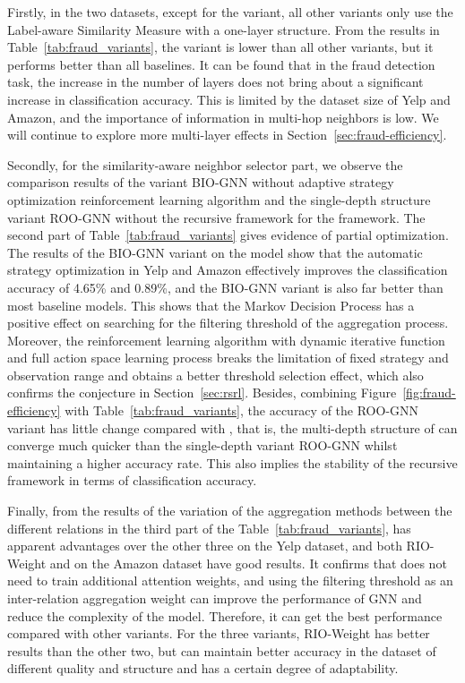 Firstly, in the two datasets, except for the \RioGNN variant, all other variants only use the Label-aware Similarity Measure with a one-layer structure.
From the results in Table~\ref{tab:fraud_variants}, the \RioGNN variant is lower than all other variants, but it performs better than all baselines.
It can be found that in the fraud detection task, the increase in the number of layers does not bring about a significant increase in classification accuracy.
This is limited by the dataset size of Yelp and Amazon, and the importance of information in multi-hop neighbors is low.
We will continue to explore more multi-layer effects in Section~\ref{sec:fraud-efficiency}.



Secondly, for the similarity-aware neighbor selector part, we observe the comparison results of the variant BIO-GNN without adaptive strategy optimization reinforcement learning algorithm and the single-depth structure variant ROO-GNN without the recursive framework for the \RSRL framework.
The second part of Table~\ref{tab:fraud_variants} gives evidence of partial optimization. 
The results of the BIO-GNN variant on the \RioGNN model show that the automatic strategy optimization in Yelp and Amazon effectively improves the classification accuracy of 4.65\% and 0.89\%, and the BIO-GNN variant is also far better than most baseline models.
This shows that the Markov Decision Process has a positive effect on searching for the filtering threshold of the aggregation process.
Moreover, the reinforcement learning algorithm with dynamic iterative function and full action space learning process breaks the limitation of fixed strategy and observation range and obtains a better threshold selection effect, which also confirms the conjecture in Section~\ref{sec:rsrl}. 
Besides, combining Figure~\ref{fig:fraud-efficiency} with Table~\ref{tab:fraud_variants}, the accuracy of the ROO-GNN variant has little change compared with \RioGNN, that is, the multi-depth structure of \RioGNN can converge much quicker than the single-depth variant ROO-GNN whilst maintaining a higher accuracy rate.
This also implies the stability of the recursive framework in terms of classification accuracy.


Finally, from the results of the variation of the aggregation methods between the different relations in the third part of the Table~\ref{tab:fraud_variants}, \RioGNN has apparent advantages over the other three on the Yelp dataset, and both RIO-Weight and \RioGNN on the Amazon dataset have good results.
It confirms that \RioGNN does not need to train additional attention weights, and using the filtering threshold as an inter-relation aggregation weight can improve the performance of GNN and reduce the complexity of the model.
Therefore, it can get the best performance compared with other variants.
For the three variants, RIO-Weight has better results than the other two, but \RioGNN can maintain better accuracy in the dataset of different quality and structure and has a certain degree of adaptability.




